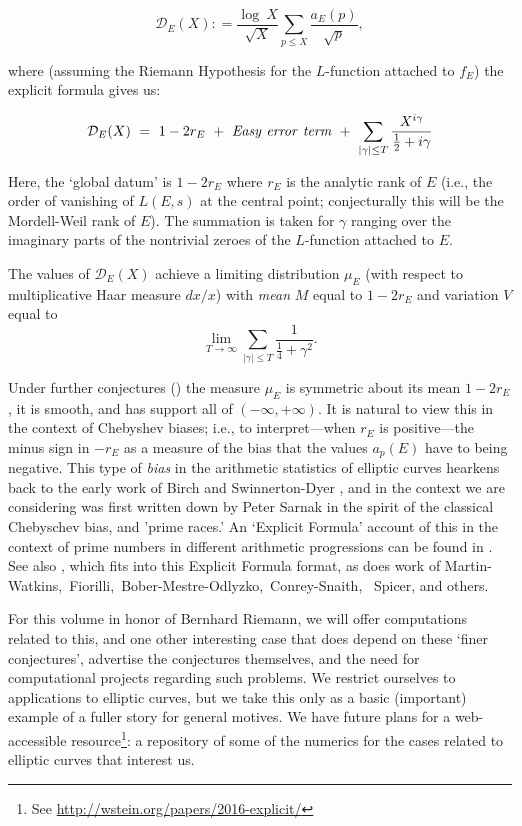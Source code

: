 \documentclass[11pt]{article}
\theoremstyle{plain}
\theoremstyle{definition}
\numberwithin{equation}{section}
\numberwithin{figure}{section}
\numberwithin{table}{section}
\begin{document}
    $$ {\mathcal D}_E(X): = {\frac{\log\ X}{\sqrt X}}\sum_{p \le X}{\frac{ a_{E}(p)}{\sqrt p}},$$

    \noindent where (assuming the Riemann Hypothesis for the $L$-function attached to  $f_E$) the explicit formula gives us:

    $$ {\mathcal D}_E(X)  \ = \ 1-2r_E  \ +\  {\rm{\it  Easy\  error\ term}}\ +\  \sum_{|\gamma| \le T}{\frac{X^{i\gamma}}{{\frac{1}{2}}+i\gamma}}$$

     Here, the `global datum'  is $1-2r_E$ where  $r_E$ is the analytic rank of $E$  (i.e., the order of vanishing of  $L(E,s)$ at the central point; conjecturally this will be the Mordell-Weil rank of $E$). The summation is taken for $\gamma$ ranging over the imaginary parts of the nontrivial zeroes of the $L$-function attached to $E$.

   The   values of  ${\mathcal D}_E(X)$ achieve a  limiting distribution $\mu_E$ (with respect to multiplicative Haar measure $dx/x$) with {\it mean} $M$ equal to $1- 2r_E$  and variation  $V$  equal to $$\lim_{T \to \infty} \sum_{|\gamma | \le T}{\frac{1}{{\frac{1}{4}} + \gamma^2}}.$$

   Under further conjectures (\cite{S})  the measure $\mu_E$  is symmetric
about its mean $1-2r_E$, it is smooth, and has support all of $(-\infty, +\infty)$. It is natural to view this in the context of Chebyshev biases; i.e., to interpret---when $r_E$ is positive---the minus sign in $-r_E$ as a measure of the bias that the values $a_p(E)$ have to being negative. This type of {\it bias} in the arithmetic statistics of elliptic curves  hearkens back to the early work of Birch and Swinnerton-Dyer \cite{S}, and in the context we are considering was  first written down by Peter Sarnak  in the spirit of the classical Chebyschev bias, and 'prime races.'   An `Explicit Formula' account of this in the context of  prime numbers in different arithmetic progressions can be found in {\cite{GM}}.  See also \cite{R-S}, \cite{S}
which fits into this Explicit Formula format, as does  work of  Martin-Watkins,\ Fiorilli,\ Bober-Mestre-Odlyzko,\ Conrey-Snaith, \ Spicer, and others.




   For this volume in honor of Bernhard Riemann,  we will offer computations related to this, and one  other interesting case  that does depend on these `finer conjectures',  advertise the conjectures themselves, and  the need for  computational projects regarding  such problems.  We restrict ourselves to applications to elliptic curves, but we take this only as a basic (important) example of a fuller story for general motives.  We have  future plans for a web-accessible resource\footnote{See \url{http://wstein.org/papers/2016-explicit/}}: a repository of some of the numerics for the cases related to elliptic curves that interest us.
\end{document}
